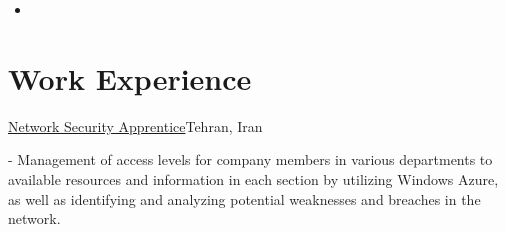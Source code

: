 \documentclass[11pt,a4paper,sans]{moderncv}        %
\begin{document}
\begin{itemize}
\item {}

\end{itemize}

\newpage
\vspace{2pt}


\section{Work Experience}
{
{\href{https://www.dotin.ir/}{Network Security Apprentice}}{Tehran, Iran}{}{\vspace{3pt} 
\begin{itemize}
- Management of access levels for company members in various departments to available resources and information in each section by utilizing Windows Azure, as well as identifying and analyzing potential weaknesses and breaches in the network.
\end{itemize}
}}
\end{document}
